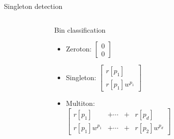 \documentclass[10pt,xcolor=table]{beamer}
\begin{document}
	\begin{frame}{Singleton detection}
			
		
			\vspace{-5pt}
			\begin{columns}
			\begin{figure}[t]
				\begin{center}
					\resizebox{0.8\textwidth}{!}{}
				\end{center}
			\end{figure}
				\begin{block}{Bin classification}
					\begin{itemize}
						\item \alert{Zeroton}:
						\vspace{3pt}
						$\begin{bmatrix}
							0 \\
							0
						\end{bmatrix}$
						\item \alert{Singleton:}
						\vspace{3pt}
						$
						\begin{bmatrix}
						r[p_1] \\
						r[p_1]w^{p_1}
						\end{bmatrix}$
						
						\item \alert{Multiton:}\\
						\vspace{7pt}
						$
						\begin{bmatrix}
						r[p_1]&+ \cdots &+&r[p_d] \\
						r[p_1]w^{p_1}&+\cdots &+&r[p_2]w^{p_d}
						\end{bmatrix}$
					\end{itemize}
				\end{block}
				

\end{columns}
\end{frame}
\end{document}

